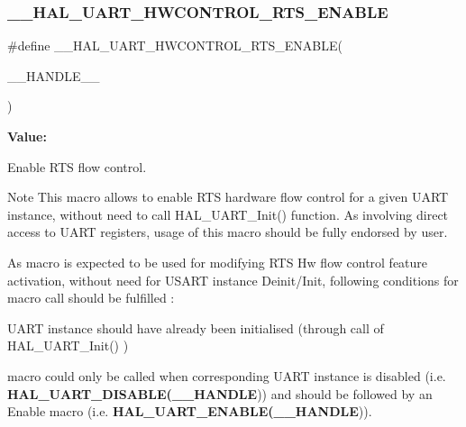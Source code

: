\subsubsection{\texorpdfstring{\_\_HAL\_UART\_HWCONTROL\_RTS\_ENABLE}{\_\_HAL\_UART\_HWCONTROL\_RTS\_ENABLE}}
{\footnotesize\ttfamily \#define \+\_\+\+\_\+\+H\+A\+L\+\_\+\+U\+A\+R\+T\+\_\+\+H\+W\+C\+O\+N\+T\+R\+O\+L\+\_\+\+R\+T\+S\+\_\+\+E\+N\+A\+B\+LE(\begin{DoxyParamCaption}\item[{}]{\+\_\+\+\_\+\+H\+A\+N\+D\+L\+E\+\_\+\+\_\+ }\end{DoxyParamCaption})}

{\bfseries Value\+:}
\begin{DoxyCode}{0}
\DoxyCodeLine{\textcolor{keywordflow}{do}\{                                                     \(\backslash\)}

\end{DoxyCode}


Enable R\+TS flow control. 

\begin{DoxyNote}{Note}
This macro allows to enable R\+TS hardware flow control for a given U\+A\+RT instance, without need to call H\+A\+L\+\_\+\+U\+A\+R\+T\+\_\+\+Init() function. As involving direct access to U\+A\+RT registers, usage of this macro should be fully endorsed by user. 

As macro is expected to be used for modifying R\+TS Hw flow control feature activation, without need for U\+S\+A\+RT instance Deinit/\+Init, following conditions for macro call should be fulfilled \+:
\begin{DoxyItemize}
\item U\+A\+RT instance should have already been initialised (through call of H\+A\+L\+\_\+\+U\+A\+R\+T\+\_\+\+Init() )
\item macro could only be called when corresponding U\+A\+RT instance is disabled (i.\+e. {\bfseries{H\+A\+L\+\_\+\+U\+A\+R\+T\+\_\+\+D\+I\+S\+A\+B\+LE(\+\_\+\+\_\+\+H\+A\+N\+D\+LE}})) and should be followed by an Enable macro (i.\+e. {\bfseries{H\+A\+L\+\_\+\+U\+A\+R\+T\+\_\+\+E\+N\+A\+B\+LE(\+\_\+\+\_\+\+H\+A\+N\+D\+LE}})). 
\end{DoxyItemize}
\end{DoxyNote}

